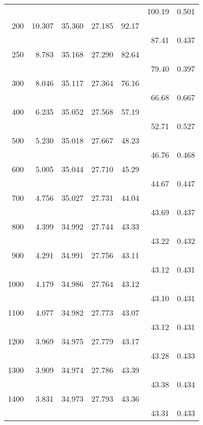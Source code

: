 \begin{table}[t!]
\begin{tabular*}{108mm}{@{}rrrrrrl}
 &            &       &       &       &     100.19& 0.501\\
200&    10.307& 35.360& 27.185& 92.17&\\
 &            &       &       &       &     87.41&  0.437\\
250&    8.783&  35.168& 27.290& 82.64&\\
 &            &       &       &       &     79.40&  0.397\\
300&    8.046&  35.117& 27.364& 76.16&\\
 &            &       &       &       &     66.68&  0.667\\
400&    6.235&  35.052& 27.568& 57.19&\\
 &            &       &       &       &     52.71&  0.527\\
500&    5.230&  35.018& 27.667& 48.23&\\
 &            &       &       &       &     46.76&  0.468\\
600&    5.005&  35.044& 27.710& 45.29&\\
 &            &       &       &       &     44.67&  0.447\\
700&    4.756&  35.027& 27.731& 44.04&\\
 &            &       &       &       &     43.69&  0.437\\
800&    4.399&  34.992& 27.744& 43.33&\\
 &            &       &       &       &     43.22&  0.432\\
900&    4.291&  34.991& 27.756& 43.11&\\
 &            &       &       &       &     43.12&  0.431\\
1000&   4.179&  34.986& 27.764& 43.12&\\
 &            &       &       &       &     43.10&  0.431\\
1100&   4.077&  34.982& 27.773& 43.07&\\
 &            &       &       &       &     43.12&  0.431\\
1200&   3.969&  34.975& 27.779& 43.17&\\
 &            &       &       &       &     43.28&  0.433\\
1300&   3.909&  34.974& 27.786& 43.39&\\
 &            &       &       &       &     43.38&  0.434\\
1400&   3.831&  34.973& 27.793& 43.36&\\
 &            &       &       &       &     43.31&  0.433\\

\end{tabular*}
\end{table}
